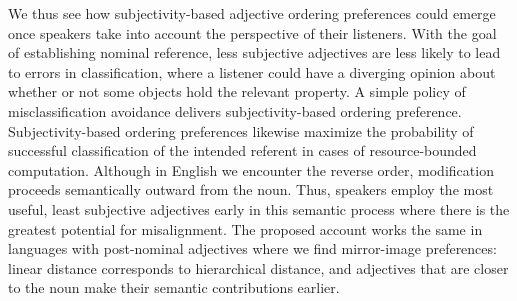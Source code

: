 \documentclass[preprint,authoryear]{elsarticle}\frenchspacing
\begin{document}
We thus see how subjectivity-based adjective ordering preferences could emerge once speakers take into account the perspective of their listeners. With the goal of establishing nominal reference, less subjective adjectives are less likely to lead to errors in classification, where a listener could have a diverging opinion about whether or not some objects hold the relevant property. A simple policy of misclassification avoidance delivers subjectivity-based ordering preference. 
Subjectivity-based ordering preferences likewise maximize the probability of successful classification of the intended referent in cases of resource-bounded computation. 
Although in English we encounter the reverse order, modification proceeds semantically outward from the noun. Thus, speakers employ the most useful, least subjective adjectives early in this semantic process where there is the greatest potential for misalignment. %
The proposed account works the same in languages with post-nominal adjectives where we find mirror-image preferences: linear distance corresponds to hierarchical distance, and adjectives that are closer to the noun make their semantic contributions earlier.
\end{document}

